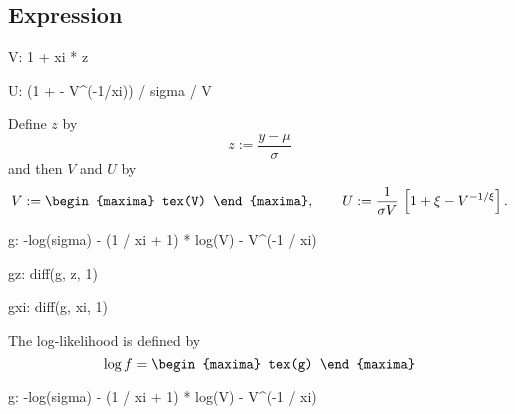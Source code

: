 \subsection{Expression}

\begin{maxima}
  V: 1 + xi * z
\end{maxima}
\begin{maxima}
  U: (1 + \xi - V^(-1/xi)) / sigma / V
\end{maxima}

Define $z$ by
$$
z := \frac{y - \mu}{\sigma}
$$
and then $V$ and $U$ by 
\[
V := 
\begin{maxima}
tex(V)
\end{maxima}, \qquad U:= \frac{1}{\sigma V}\,\left[ 1 + \xi - V^{-1/\xi}\right]. 
\]
\begin{maxima}
  g: -log(sigma) - (1 / xi + 1) * log(V) - V^(-1 / xi)
\end{maxima}
%
\begin{maxima}
  gz: diff(g, z, 1)
\end{maxima}%
\begin{maxima}
  gxi: diff(g, xi, 1)
\end{maxima}%

The log-likelihood is defined by
\[
\log f = 
\begin{maxima}
  tex(g)
\end{maxima}
\]

\begin{maxima}
  g: -log(sigma) - (1 / xi + 1) * log(V) - V^(-1 / xi)
\end{maxima}





